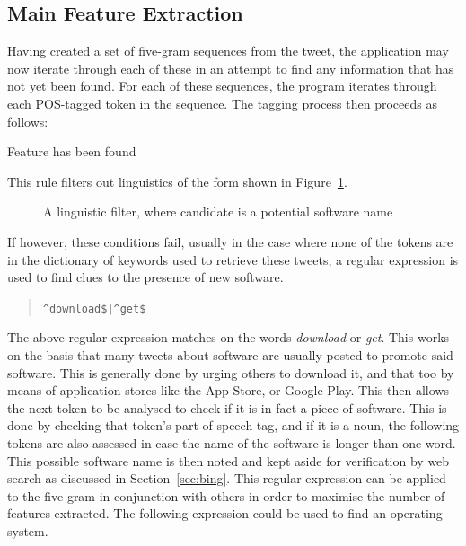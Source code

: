 \subsection{Main Feature Extraction}
Having created a set of five-gram sequences from the tweet, the application may now iterate through each of these in an attempt to find any information that has not yet been found. For each of these sequences, the program iterates through each POS-tagged token in the sequence. The tagging process then proceeds as follows: 
\newline
\begin{algorithmic}
            \State Feature has been found
        \EndIf
    \EndIf
\EndIf
\newline
\end{algorithmic}

This rule filters out linguistics of the form shown in Figure~\ref{fig:rule1}.
\begin{figure}[h!]
 \centering
  
  \caption{A linguistic filter, where candidate is a potential software name
    \label{fig:rule1}}
\end{figure}
If however, these conditions fail, usually in the case where none of the tokens are in the dictionary of keywords used to retrieve these tweets, a regular expression is used to find clues to the presence of new software.

\begin{quote}
\verb~^download$|^get$~
\end{quote}

The above regular expression matches on the words \emph{download} or \emph{get}. This works on the basis that many tweets about software are usually posted to promote said software. This is generally done by urging others to download it, and that too by means of application stores like the App Store, or Google Play. This then allows the next token to be analysed to check if it is in fact a piece of software. This is done by checking that token's part of speech tag, and if it is a noun, the following tokens are also assessed in case the name of the software is longer than one word. This possible software name is then noted and kept aside for verification by web search as discussed in Section~\ref{sec:bing}. This regular expression can be applied to the five-gram in conjunction with others in order to maximise the number of features extracted. The following expression could be used to find an operating system.

